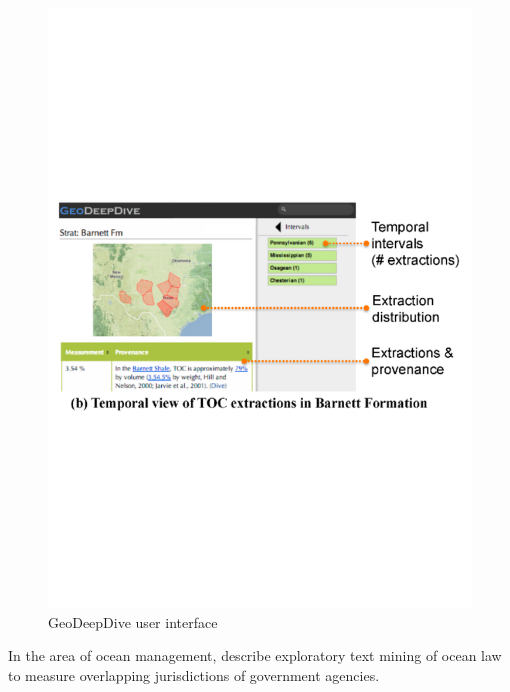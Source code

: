 \begin{figure}
\begin{center}
\includegraphics[scale=0.6]{figures/geodeepdive-2.pdf}
 \caption{GeoDeepDive user interface \citep{Zhang2013GeoDeepDive}}
\label{fig:geodeepdive}
\end{center}
\end{figure} 
   
In the area of ocean management, \citet{Ekstrom2008Exploratory} describe exploratory text mining of ocean law to measure overlapping jurisdictions of government agencies.  


